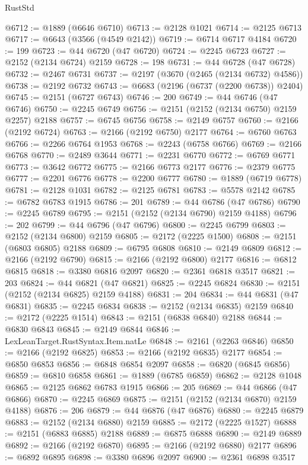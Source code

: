 \begin{lexlean}{RustStd}
\begin{coremodule}
@6712 := @1889 (@6646 @6710)
@6713 := @2128 @1021
@6714 := @2125 @6713
@6717 := @6643 (@3566 (@4549 @2142))
@6719 := @6714 @6717 @4184
@6720 := 199
@6723 := @44 @6720 (@47 @6720)
@6724 := @2245 @6723
@6727 := @2152 (@2134 @6724) @2159
@6728 := 198
@6731 := @44 @6728 (@47 @6728)
@6732 := @2467 @6731
@6737 := @2197 (@3670 (@2465 (@2134 @6732) @4586))
@6738 := @2192 @6732
@6743 := @6683 (@2196 (@6737 (@2200 @6738)) @2404)
@6745 := @2151 (@6727 @6743)
@6746 := 200
@6749 := @44 @6746 (@47 @6746)
@6750 := @2245 @6749
@6756 := @2151 (@2152 (@2134 @6750) @2159 @2257) @2188
@6757 := @6745 @6756
@6758 := @2149 @6757
@6760 := @2166 (@2192 @6724)
@6763 := @2166 (@2192 @6750) @2177
@6764 := @6760 @6763
@6766 := @2266 @6764 @1953
@6768 := @2243 (@6758 @6766)
@6769 := @2166 @6768
@6770 := @2489 @3644
@6771 := @2231 @6770
@6772 := @6769 @6771
@6773 := @3642 @6772
@6775 := @2166 @6773 @2177
@6776 := @2379 @6775
@6777 := @2201 @6776
@6778 := @2200 @6777
@6780 := @1889 (@6719 @6778)
@6781 := @2128 @1031
@6782 := @2125 @6781
@6783 := @5578 @2142
@6785 := @6782 @6783 @1915
@6786 := 201
@6789 := @44 @6786 (@47 @6786)
@6790 := @2245 @6789
@6795 := @2151 (@2152 (@2134 @6790) @2159 @4188)
@6796 := 202
@6799 := @44 @6796 (@47 @6796)
@6800 := @2245 @6799
@6803 := @2152 (@2134 @6800) @2159
@6805 := @2172 (@2225 @1500)
@6808 := @2151 (@6803 @6805) @2188
@6809 := @6795 @6808
@6810 := @2149 @6809
@6812 := @2166 (@2192 @6790)
@6815 := @2166 (@2192 @6800) @2177
@6816 := @6812 @6815
@6818 := @3380 @6816 @2097
@6820 := @2361 @6818 @3517
@6821 := 203
@6824 := @44 @6821 (@47 @6821)
@6825 := @2245 @6824
@6830 := @2151 (@2152 (@2134 @6825) @2159 @4188)
@6831 := 204
@6834 := @44 @6831 (@47 @6831)
@6835 := @2245 @6834
@6838 := @2152 (@2134 @6835) @2159
@6840 := @2172 (@2225 @1514)
@6843 := @2151 (@6838 @6840) @2188
@6844 := @6830 @6843
@6845 := @2149 @6844
@6846 := LexLeanTarget.RustSyntax.Item.natLe
@6848 := @2161 (@2263 @6846)
@6850 := @2166 (@2192 @6825)
@6853 := @2166 (@2192 @6835) @2177
@6854 := @6850 @6853
@6856 := @6848 @6854 @2097
@6858 := @6820 (@6845 @6856)
@6859 := @6810 @6858
@6861 := @1889 (@6785 @6859)
@6862 := @2128 @1048
@6865 := @2125 @6862 @6783 @1915
@6866 := 205
@6869 := @44 @6866 (@47 @6866)
@6870 := @2245 @6869
@6875 := @2151 (@2152 (@2134 @6870) @2159 @4188)
@6876 := 206
@6879 := @44 @6876 (@47 @6876)
@6880 := @2245 @6879
@6883 := @2152 (@2134 @6880) @2159
@6885 := @2172 (@2225 @1527)
@6888 := @2151 (@6883 @6885) @2188
@6889 := @6875 @6888
@6890 := @2149 @6889
@6892 := @2166 (@2192 @6870)
@6895 := @2166 (@2192 @6880) @2177
@6896 := @6892 @6895
@6898 := @3380 @6896 @2097
@6900 := @2361 @6898 @3517

\end{coremodule}
\end{lexlean}
